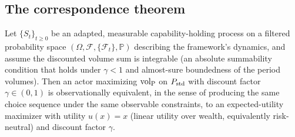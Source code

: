 \subsection{The correspondence theorem}
\label{sec:fc_correspondence}

\begin{theorem}
\label{thm:fungibility_collapse}
Let $\{S_t\}_{t \geq 0}$ be an adapted, measurable
capability-holding process on a filtered probability space
$(\Omega, \mathcal{F}, \{\mathcal{F}_t\}, \mathbb{P})$ describing
the framework's dynamics, and assume the discounted volume sum
is integrable (an absolute summability condition that holds
under $\gamma < 1$ and almost-sure boundedness of the period
volumes).  Then an actor maximizing ${\operatorname{vol}_{\mathrm{P}}}$ on $P_{\mathrm{std}}$ with
discount factor $\gamma \in (0,1)$ is observationally
equivalent, in the sense of producing the same choice sequence
under the same observable constraints, to an expected-utility
maximizer with utility $u(x) = x$ (linear utility over wealth,
equivalently risk-neutral) and discount factor $\gamma$.
\end{theorem}

